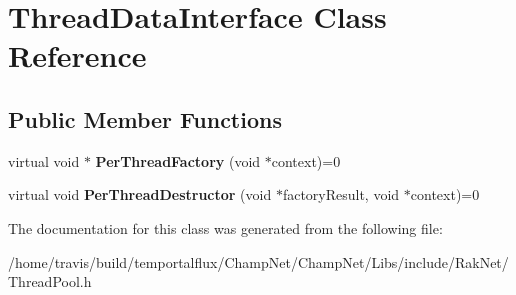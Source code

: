 \hypertarget{class_thread_data_interface}{\section{Thread\-Data\-Interface Class Reference}
\label{class_thread_data_interface}
}
\subsection*{Public Member Functions}
\begin{DoxyCompactItemize}
\item 
\hypertarget{class_thread_data_interface_a1f11c7255aa2c0989e9a2b37b6c07d02}{virtual void $\ast$ {\bfseries Per\-Thread\-Factory} (void $\ast$context)=0}\label{class_thread_data_interface_a1f11c7255aa2c0989e9a2b37b6c07d02}

\item 
\hypertarget{class_thread_data_interface_ab1c502c59f275eff7f559326ff0faf03}{virtual void {\bfseries Per\-Thread\-Destructor} (void $\ast$factory\-Result, void $\ast$context)=0}\label{class_thread_data_interface_ab1c502c59f275eff7f559326ff0faf03}

\end{DoxyCompactItemize}


The documentation for this class was generated from the following file\-:\begin{DoxyCompactItemize}
\item 
/home/travis/build/temportalflux/\-Champ\-Net/\-Champ\-Net/\-Libs/include/\-Rak\-Net/Thread\-Pool.\-h\end{DoxyCompactItemize}
